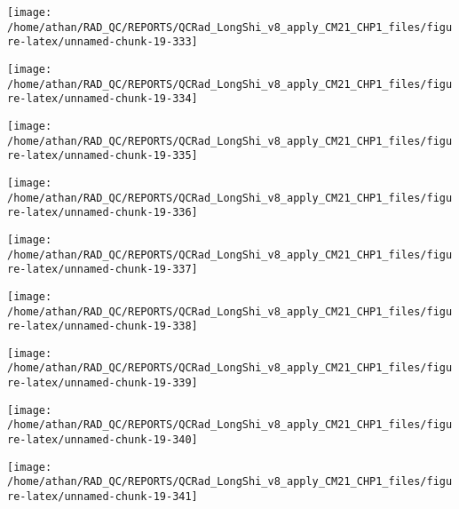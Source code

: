 \documentclass[
  10pt,
  a4paper,oneside]{article}
\begin{document}
\begin{center}\texttt{[image: /home/athan/RAD\_QC/REPORTS/QCRad\_LongShi\_v8\_apply\_CM21\_CHP1\_files/figure-latex/unnamed-chunk-19-333]} \end{center}

\begin{center}\texttt{[image: /home/athan/RAD\_QC/REPORTS/QCRad\_LongShi\_v8\_apply\_CM21\_CHP1\_files/figure-latex/unnamed-chunk-19-334]} \end{center}

\begin{center}\texttt{[image: /home/athan/RAD\_QC/REPORTS/QCRad\_LongShi\_v8\_apply\_CM21\_CHP1\_files/figure-latex/unnamed-chunk-19-335]} \end{center}

\begin{center}\texttt{[image: /home/athan/RAD\_QC/REPORTS/QCRad\_LongShi\_v8\_apply\_CM21\_CHP1\_files/figure-latex/unnamed-chunk-19-336]} \end{center}

\begin{center}\texttt{[image: /home/athan/RAD\_QC/REPORTS/QCRad\_LongShi\_v8\_apply\_CM21\_CHP1\_files/figure-latex/unnamed-chunk-19-337]} \end{center}

\begin{center}\texttt{[image: /home/athan/RAD\_QC/REPORTS/QCRad\_LongShi\_v8\_apply\_CM21\_CHP1\_files/figure-latex/unnamed-chunk-19-338]} \end{center}

\begin{center}\texttt{[image: /home/athan/RAD\_QC/REPORTS/QCRad\_LongShi\_v8\_apply\_CM21\_CHP1\_files/figure-latex/unnamed-chunk-19-339]} \end{center}

\begin{center}\texttt{[image: /home/athan/RAD\_QC/REPORTS/QCRad\_LongShi\_v8\_apply\_CM21\_CHP1\_files/figure-latex/unnamed-chunk-19-340]} \end{center}

\begin{center}\texttt{[image: /home/athan/RAD\_QC/REPORTS/QCRad\_LongShi\_v8\_apply\_CM21\_CHP1\_files/figure-latex/unnamed-chunk-19-341]} \end{center}
\end{document}
